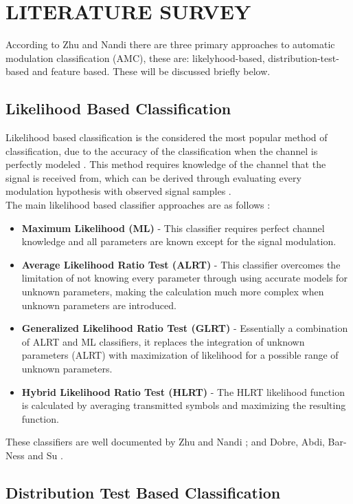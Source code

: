 \documentclass[10pt,twocolumn]{witseiepaper}
\begin{document}
\section{LITERATURE SURVEY}
\label{sec:literature}
According to Zhu and Nandi \cite{zhu2014automatic} there are three primary approaches to automatic modulation classification (AMC), these are: likelyhood-based, distribution-test-based and feature based. These will be discussed briefly below.

	\subsection{Likelihood Based Classification}
	\label{subsec:likelyhood}
	Likelihood based classification is the considered the most popular method of classification, due to the accuracy of the classification when the channel is perfectly modeled \cite{zhu2014automatic}. This method requires knowledge of the channel that the signal is received from, which can be derived through evaluating every modulation hypothesis with observed signal samples \cite{zhu2014automatic}.\\[10pt]

	The main likelihood based classifier approaches are as follows \cite{zhu2014automatic}:
	\begin{itemize}
		\item \textbf{Maximum Likelihood (ML)} - This classifier requires perfect channel knowledge and all parameters are known except for the signal modulation.
		\item \textbf{Average Likelihood Ratio Test (ALRT)} - This classifier overcomes the limitation of not knowing every parameter through using accurate models for unknown parameters, making the calculation much more complex when unknown parameters are introduced.
		\item \textbf{Generalized Likelihood Ratio Test (GLRT)} - Essentially a combination of ALRT and ML classifiers, it replaces the integration of unknown parameters (ALRT) with maximization of likelihood for a possible range of unknown parameters.
		\item \textbf{Hybrid Likelihood Ratio Test (HLRT)} - The HLRT likelihood function is calculated by averaging transmitted symbols and maximizing the resulting function.
	\end{itemize}
	These classifiers are well documented by Zhu and Nandi \cite{zhu2014automatic}; and Dobre, Abdi, Bar-Ness and Su \cite{dobre2007survey}. 

	\subsection{Distribution Test Based Classification}
	\label{subsec:distribution}
	
\end{document}
